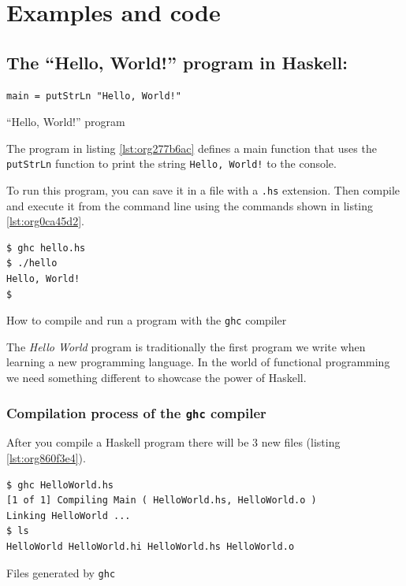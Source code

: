 \documentclass[a4paper, titlepage, twoside]{article}
\begin{document}
\section{Examples and code}
\label{sec:org11dcd70}

\subsection{The ``Hello, World!'' program in Haskell:}
\label{sec:org5a97080}

\begin{listing}[htbp]
\begin{verbatim}
main = putStrLn "Hello, World!"
\end{verbatim}
\caption{\label{lst:org277b6ac}``Hello, World!'' program}
\end{listing}

The program in listing \ref{lst:org277b6ac} defines a main function that uses the \texttt{putStrLn} function to print the string \texttt{Hello, World!} to the console.

To run this program, you can save it in a file with a \texttt{.hs} extension. Then compile and execute it from the command line using the commands shown in listing \ref{lst:org0ca45d2}.

\begin{listing}[htbp]
\begin{verbatim}
$ ghc hello.hs
$ ./hello
Hello, World!
$
\end{verbatim}
\caption{\label{lst:org0ca45d2}How to compile and run a program with the \texttt{ghc} compiler}
\end{listing}

The \emph{Hello World} program is traditionally the first program we write when learning a new programming language. In the world of functional programming we need something different to showcase the power of Haskell.

\subsubsection{Compilation process of the \texttt{ghc} compiler}
\label{sec:org48da13a}

After you compile a Haskell program there will be 3 new files (listing \ref{lst:org860f3e4}).

\begin{listing}[htbp]
\begin{verbatim}
$ ghc HelloWorld.hs
[1 of 1] Compiling Main ( HelloWorld.hs, HelloWorld.o )
Linking HelloWorld ...
$ ls
HelloWorld HelloWorld.hi HelloWorld.hs HelloWorld.o
\end{verbatim}
\caption{\label{lst:org860f3e4}Files generated by \texttt{ghc}}
\end{listing}
\end{document}
